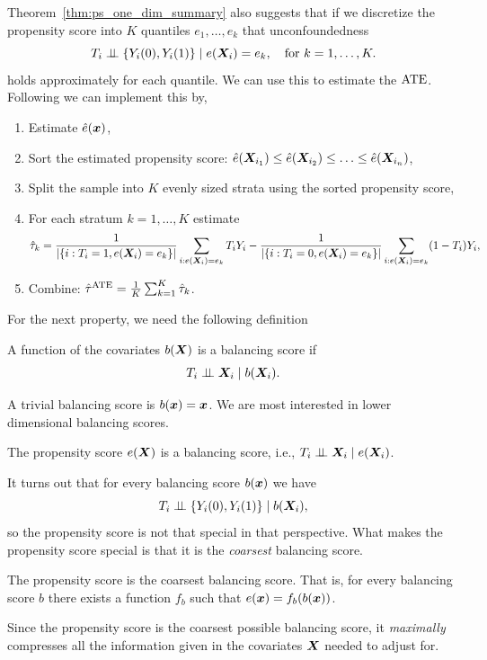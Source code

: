 \documentclass[11pt]{exam}
\begin{document}
\begin{remark}
    Theorem~\ref{thm:ps_one_dim_summary} also suggests that if we discretize the propensity score into $K$ quantiles $e_1, \ldots, e_k$ that unconfoundedness
\[
    T_i \perp\!\!\!\perp \{Y_i(0), Y_i(1)\} \mid e(\bm{X}_i) = e_k, \quad \text{for } k = 1, \ldots, K. 
\]
holds approximately for each quantile. We can use this to estimate the $\mathrm{ATE}$. Following \citet[Section~2]{wagerathey2023causalinference} we can implement this by, 
\begin{enumerate}
    \item Estimate $\hat e(\bm{x})$,
    \item Sort the estimated propensity score: $\hat e(\bm{X}_{i_1}) \leq \hat e(\bm{X}_{i_2}) \leq \ldots \leq \hat e(\bm{X}_{i_n})$,
    \item Split the sample into $K$ evenly sized strata using the sorted propensity score,
    \item For each stratum $k=1, \ldots, K$ estimate
    \[
     \hat \tau_k = \frac{1}{|\{i: T_i = 1, e(\bm{X}_i) = e_k\}|}\sum_{i: e(\bm{X}_i) = e_k} T_i Y_i - \frac{1}{|\{i: T_i = 0, e(\bm{X}_i) = e_k\}|}\sum_{i: e(\bm{X}_i) = e_k} (1- T_i) Y_i,
    \]
    \item Combine: $\hat \tau^{\mathrm{ATE}} = \frac{1}{K} \sum_{k=1}^K \hat \tau_k$.
\end{enumerate}
\end{remark}

For the next property, we need the following definition
\begin{definition}
    A function of the covariates $b(\bm{X})$ is a balancing score if
    \[
    T_i \perp\!\!\!\perp \bm{X}_i \mid b(\bm{X}_i).
    \]
\end{definition}
A trivial balancing score is $b(\bm{x}) = \bm{x}$. We are most interested in lower dimensional balancing scores. 

\begin{lemma}
    The propensity score $e(\bm{X})$ is a balancing score, i.e., $T_i \perp\!\!\!\perp \bm{X}_i \mid e(\bm{X}_i)$.
\end{lemma}

It turns out that for every balancing score $b(\bm{x})$ we have
\[
    T_i \perp\!\!\!\perp \{Y_i(0), Y_i(1)\} \mid b(\bm{X}_i),
\]
so the propensity score is not that special in that perspective. What makes the propensity score special is that it is the \emph{coarsest} balancing score.

\begin{lemma}
    The propensity score is the coarsest balancing score. That is, for every balancing score $b$ there exists a function $f_b$ such that $e(\bm{x}) = f_b(b(\bm{x}))$.
\end{lemma}
Since the propensity score is the coarsest possible balancing score, it \emph{maximally} compresses all the information given in the covariates $\bm{X}$ needed to adjust for.
\end{document}

